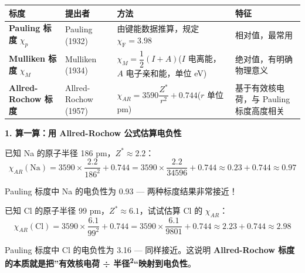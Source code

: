 {\def\LTcaptype{none} %
\begin{longtable}[]{@{}
  >{\raggedright\arraybackslash}p{}
  >{\raggedright\arraybackslash}p{}
  >{\raggedright\arraybackslash}p{}
  >{\raggedright\arraybackslash}p{}@{}}
\toprule\noalign{}
\begin{minipage}[b]{\linewidth}\raggedright
标度
\end{minipage} & \begin{minipage}[b]{\linewidth}\raggedright
提出者
\end{minipage} & \begin{minipage}[b]{\linewidth}\raggedright
方法
\end{minipage} & \begin{minipage}[b]{\linewidth}\raggedright
特征
\end{minipage} \\
\midrule\noalign{}
\endhead
\bottomrule\noalign{}
\endlastfoot
\textbf{Pauling 标度} \(\chi_p\) & Pauling (1932) & 由键能数据推算，规定 \(\chi_{\mathrm{F}}=3.98\) & 相对值，最常用 \\
\textbf{Mulliken 标度} \(\chi_M\) & Mulliken (1934) & \(\chi_M = \dfrac{1}{2}(I + A)\)(\(I\) 电离能，\(A\) 电子亲和能，单位 eV) & 绝对值，有明确物理意义 \\
\textbf{Allred-Rochow 标度} & Allred-Rochow (1957) & \(\chi_{AR} = 3590\dfrac{Z^*}{r^2} + 0.744\)(\(r\) 单位 pm) & 基于有效核电荷，与 Pauling 标度高度相关 \\
\end{longtable}
}

\textbf{1. 算一算：用 Allred-Rochow 公式估算电负性}

已知 Na 的原子半径 186 pm，\(Z^* \approx 2.2\)：
\[\chi_{AR}(\mathrm{Na}) = 3590 \times \frac{2.2}{186^2} + 0.744 = 3590 \times \frac{2.2}{34596} + 0.744 \approx 0.23 + 0.744 \approx 0.97\]

Pauling 标度中 Na 的电负性为 0.93 --- 两种标度结果非常接近！

已知 Cl 的原子半径 99 pm，\(Z^* \approx 6.1\)，试试估算 Cl 的 \(\chi_{AR}\)：
\[\chi_{AR}(\mathrm{Cl}) = 3590 \times \frac{6.1}{99^2} + 0.744 = 3590 \times \frac{6.1}{9801} + 0.744 \approx 2.23 + 0.744 \approx 2.98\]

Pauling 标度中 Cl 的电负性为 3.16 --- 同样接近。这说明 \textbf{Allred-Rochow 标度的本质就是把''有效核电荷 ÷ 半径\textsuperscript{2}``映射到电负性}。

